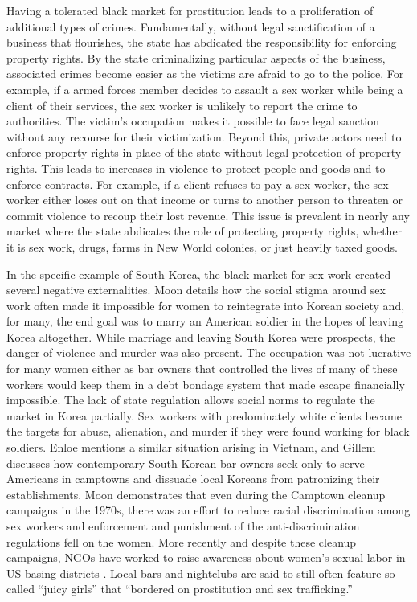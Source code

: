 Having a tolerated black market for prostitution leads to a proliferation of additional types of crimes. Fundamentally, without legal sanctification of a business that flourishes, the state has abdicated the responsibility for enforcing property rights. By the state criminalizing particular aspects of the business, associated crimes become easier as the victims are afraid to go to the police. For example, if a armed forces member decides to assault a sex worker while being a client of their services, the sex worker is unlikely to report the crime to authorities. The victim's occupation makes it possible to face legal sanction without any recourse for their victimization. Beyond this, private actors need to enforce property rights in place of the state without legal protection of property rights. This leads to increases in violence to protect people and goods and to enforce contracts. For example, if a client refuses to pay a sex worker, the sex worker either loses out on that income or turns to another person to threaten or commit violence to recoup their lost revenue. This issue is prevalent in nearly any market where the state abdicates the role of protecting property rights, whether it is sex work, drugs, farms in New World colonies, or just heavily taxed goods.\cite{Resignato2000,Fleenor2003,Reynolds2010,Vandusky2011}

In the specific example of South Korea, the black market for sex work created several negative externalities. Moon details how the social stigma around sex work often made it impossible for women to reintegrate into Korean society and, for many, the end goal was to marry an American soldier in the hopes of leaving Korea altogether.\cite{Moon1997} While marriage and leaving South Korea were prospects, the danger of violence and murder was also present. The occupation was not lucrative for many women either as bar owners that controlled the lives of many of these workers would keep them in a debt bondage system that made escape financially impossible.\cite{Moon1997,Gillem2007} The lack of state regulation allows social norms to regulate the market in Korea partially. Sex workers with predominately white clients became the targets for abuse, alienation, and murder if they were found working for black soldiers.\cite{Moon1997} Enloe mentions a similar situation arising in Vietnam, and Gillem discusses how contemporary South Korean bar owners seek only to serve Americans in camptowns and dissuade local Koreans from patronizing their establishments.\cite{Enloe2000,Gillem2007} Moon demonstrates that even during the Camptown cleanup campaigns in the 1970s, there was an effort to reduce racial discrimination among sex workers and enforcement and punishment of the anti-discrimination regulations fell on the women. More recently and despite these cleanup campaigns, NGOs have worked to raise awareness about women's sexual labor in US basing districts \cite{Cooley2008}. Local bars and nightclubs are said to still often feature so-called ``juicy girls'' that ``bordered on prostitution and sex trafficking\cite{koreaone20210926}.''

